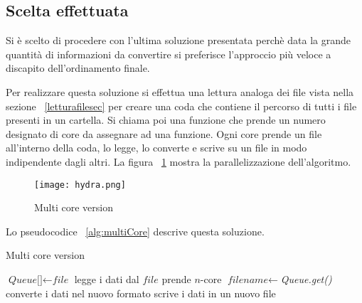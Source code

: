 \documentclass[../main.tex]{subfiles}
\begin{document}
\subsection{Scelta effettuata}

Si è scelto di procedere con l'ultima soluzione presentata perchè data la grande quantità di informazioni da convertire si preferisce l'approccio più veloce a discapito dell'ordinamento finale.

Per realizzare questa soluzione si effettua una lettura analoga dei file vista nella sezione ~\ref{letturafilesec} per creare una coda che contiene il percorso di tutti i file presenti in un cartella. Si chiama poi una funzione che prende un numero designato di core da assegnare ad una funzione. Ogni core prende un file all'interno della coda, lo legge, lo converte e scrive su un file in modo indipendente dagli altri.
La figura ~\ref{fig:multiCore} mostra la parallelizzazione dell'algoritmo.

\begin{figure}[H]
				\centering
\texttt{[image: hydra.png]}
				\caption{Multi core version}
				\label{fig:multiCore}
\end{figure}

Lo pseudocodice ~\ref{alg:multiCore} descrive questa soluzione.
\begin{algorithm}[H]
\caption{Multi core version}
				\label{alg:multiCore}
\begin{algorithmic}[1]
\State $\textit{Queue[]} \gets \textit{file}$
\State legge i dati dal $\textit{file}$
\State prende $n$-core
\State $\textit{filename} \gets $\textit{Queue.get()}
\State converte i dati nel nuovo formato
\State scrive i dati in un nuovo file
\EndWhile
\EndFor
\EndProcedure
\end{algorithmic}
\end{algorithm}
\end{document}
